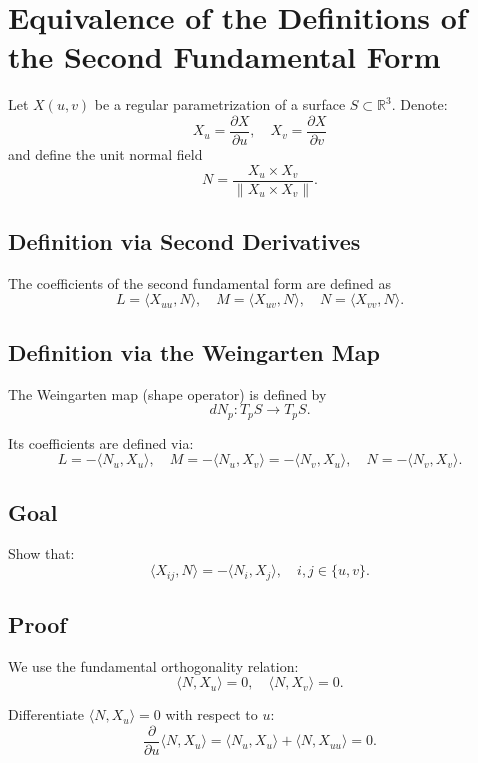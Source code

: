 \documentclass[11pt]{article}
\begin{document}
	
	\section*{Equivalence of the Definitions of the Second Fundamental Form}
	
	Let $X(u,v)$ be a regular parametrization of a surface $S \subset \mathbb{R}^3$.
	Denote:
	\[
	X_u = \frac{\partial X}{\partial u}, \quad
	X_v = \frac{\partial X}{\partial v}
	\]
	and define the unit normal field
	\[
	N = \frac{X_u \times X_v}{\|X_u \times X_v\|}.
	\]
	
	\subsection*{Definition via Second Derivatives}
	
	The coefficients of the second fundamental form are defined as
	\[
	L = \langle X_{uu}, N \rangle, \quad
	M = \langle X_{uv}, N \rangle, \quad
	N = \langle X_{vv}, N \rangle.
	\]
	
	\subsection*{Definition via the Weingarten Map}
	
	The Weingarten map (shape operator) is defined by
	\[
	dN_p : T_p S \to T_p S.
	\]
	
	Its coefficients are defined via:
	\[
	L = -\langle N_u, X_u \rangle, \quad
	M = -\langle N_u, X_v \rangle = -\langle N_v, X_u \rangle, \quad
	N = -\langle N_v, X_v \rangle.
	\]
	
	\subsection*{Goal}
	
	Show that:
	\[
	\langle X_{ij}, N \rangle = -\langle N_i, X_j \rangle, 
	\quad i,j \in \{u,v\}.
	\]
	
	\subsection*{Proof}
	
	We use the fundamental orthogonality relation:
	\[
	\langle N, X_u \rangle = 0, \quad
	\langle N, X_v \rangle = 0.
	\]
	
	Differentiate $\langle N, X_u \rangle = 0$ with respect to $u$:
	\[
	\frac{\partial}{\partial u} \langle N, X_u \rangle
	= \langle N_u, X_u \rangle + \langle N, X_{uu} \rangle = 0.
	\]
	
\end{document}

